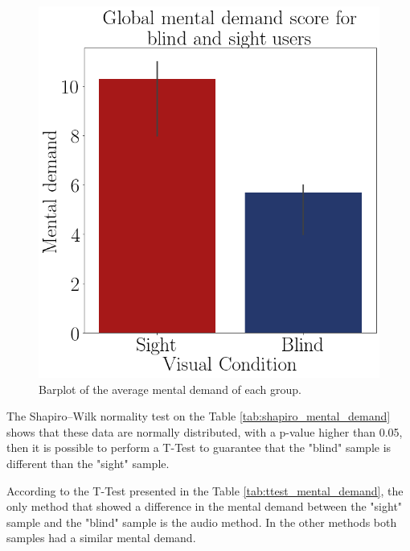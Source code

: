 \begin{figure}[!htb]
\begin{minipage}{.45\linewidth}
        \vspace{1.8cm}
        \centering
        \includegraphics[width = \linewidth]{Resultados/Nasa/Figuras/png/barplot_md_avg_global.png}
        \caption{Barplot of the average mental demand of each group.}
        \label{fig:barplot_md_global}
    \end{minipage}
\end{figure}

The Shapiro–Wilk normality test on the Table \ref{tab:shapiro_mental_demand} shows that these data are normally distributed, with a p-value higher than 0.05, then it is possible to perform a T-Test to guarantee that the "blind" sample is different than the "sight" sample.

%

According to the T-Test presented in the Table \ref{tab:ttest_mental_demand}, the only method that showed a difference in the mental demand between the "sight" sample and the "blind" sample is the audio method. In the other methods both samples had a similar mental demand.

